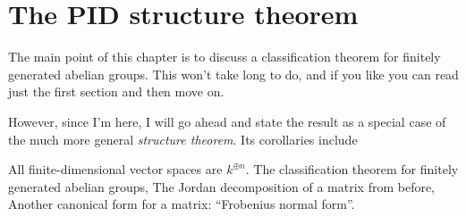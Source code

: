 \chapter{The PID structure theorem}
The main point of this chapter is to discuss a classification
theorem for finitely generated abelian groups.
This won't take long to do, and if you like you can read
just the first section and then move on.

However, since I'm here, I will go ahead and state the result as a
special case of the much more general \emph{structure theorem}.
Its corollaries include
\begin{itemize}
	\ii All finite-dimensional vector spaces are $k^{\oplus n}$.
	\ii The classification theorem for finitely generated abelian groups,
	\ii The Jordan decomposition of a matrix from before,
	\ii Another canonical form for a matrix: ``Frobenius normal form''.
\end{itemize}

